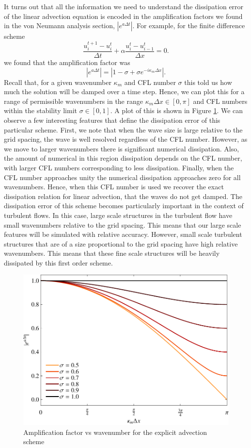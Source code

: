 It turns out that all the information we need to understand the dissipation error of the linear advection equation is encoded in the amplification factors we found in the von Neumann analysis section, $|e^{a\Delta t}|$. For example, for the finite difference scheme
\begin{equation}
	\frac{u_i^{t+1} - u_{i}^t}{\Delta t} +  \alpha \frac{u_i^t - u_{i-1}^t}{\Delta x} = 0.
\end{equation}
we found that the amplification factor was 
\begin{equation}
	|e^{a\Delta t}| = |1 - \sigma + \sigma e^{-i \kappa_m \Delta x}|.
\end{equation} 
Recall that, for a given wavenumber $\kappa_m$ and CFL number $\sigma$ this told us how much the solution will be damped over a time step. Hence, we can plot this for a range of permissible wavenumbers in the range $\kappa_m \Delta x \in [0,\pi]$ and CFL numbers within the stability limit $\sigma \in [0,1]$. A plot of this is shown in Figure \ref{fig:dissipation_advection_explicit}. We can observe a few interesting features that define the dissipation error of this particular scheme. First, we note that when the wave size is large relative to the grid spacing, the wave is well resolved regardless of the CFL number. However, as we move to larger wavenumbers there is significant numerical dissipation. Also, the amount of numerical in this region dissipation depends on the CFL number, with larger CFL numbers corresponding to less dissipation. Finally, when the CFL number approaches unity the numerical dissipation approaches zero for all wavenumbers. Hence, when this CFL number is used we recover the exact dissipation relation for linear advection, that the waves do not get damped. The dissipation error of this scheme becomes particularly important in the context of turbulent flows. In this case, large scale structures in the turbulent flow have small wavenumbers relative to the grid spacing. This means that our large scale features will be simulated with relative accuracy. However, small scale turbulent structures that are of a size proportional to the grid spacing have high relative wavenumbers. This means that these fine scale structures will be heavily dissipated by this first order scheme.
\begin{figure}[htbp]
	\centering
	\includegraphics[width=0.6\linewidth]{Pictures/dissipation_adv_explct}
	\caption{Amplification factor vs wavenumber for the explicit advection scheme}
	\label{fig:dissipation_advection_explicit}
\end{figure}
